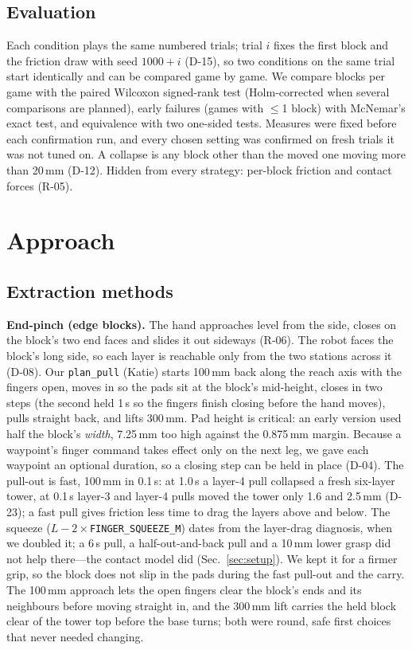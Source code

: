 \documentclass[conference]{IEEEtran}
\begin{document}
\subsection{Evaluation}
Each condition plays the same numbered trials; trial $i$ fixes the first block and the friction draw with seed $1000+i$
(D-15), so two conditions on the same trial start identically and can be compared game by game. We compare blocks per
game with the paired Wilcoxon signed-rank test (Holm-corrected when several comparisons are planned), early failures
(games with $\le$1 block) with McNemar's exact test, and equivalence with two one-sided tests. Measures were fixed
before each confirmation run, and every chosen setting was confirmed on fresh trials it was not tuned on. A collapse is
any block other than the moved one moving more than 20\,mm (D-12). Hidden from every strategy: per-block friction and
contact forces (R-05).

\section{Approach}\label{sec:approach}
\subsection{Extraction methods}
\textbf{End-pinch (edge blocks).} The hand approaches level from the side, closes on the block's two end faces and
slides it out sideways (R-06). The robot faces the block's long side, so each layer is reachable only from the two
stations across it (D-08). Our \texttt{plan\_pull} (Katie) starts 100\,mm back along the reach axis with the
fingers open, moves in so the pads sit at the block's mid-height, closes in two steps (the second held 1\,s so the
fingers finish closing before the hand moves), pulls straight back, and lifts 300\,mm. Pad height is critical: an early
version used half the block's \emph{width}, 7.25\,mm too high against the 0.875\,mm margin. Because a waypoint's finger
command takes effect only on the next leg, we gave each waypoint an optional duration, so a closing step can be held
in place (D-04). The pull-out is fast, 100\,mm in 0.1\,s: at 1.0\,s a layer-4 pull collapsed a fresh six-layer tower,
at 0.1\,s layer-3 and layer-4 pulls moved the tower only 1.6 and 2.5\,mm (D-23); a fast pull gives friction less time
to drag the layers above and below. The squeeze ($L-2\times$\texttt{FINGER\_SQUEEZE\_M}) dates from the layer-drag
diagnosis, when we doubled it; a 6\,s pull, a half-out-and-back pull and a 10\,mm lower grasp did not help there---the
contact model did (Sec.~\ref{sec:setup}). We kept it for a firmer grip, so the block does not slip in the pads
during the fast pull-out and the carry. The 100\,mm approach lets the open fingers clear the block's ends and its
neighbours before moving straight in, and the 300\,mm lift carries the held block clear of the tower top before the base
turns; both were round, safe first choices that never needed changing.
\end{document}
